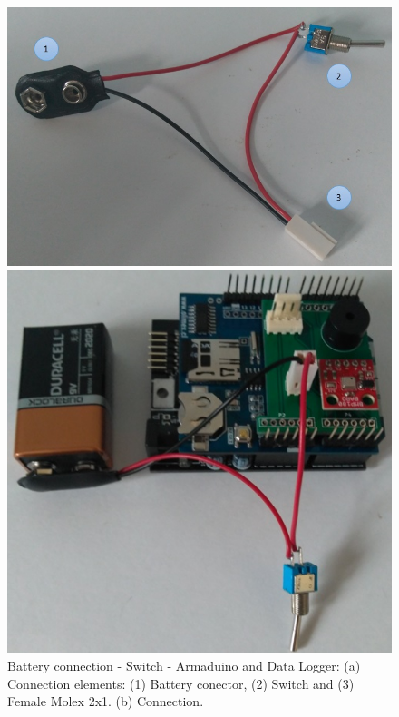 \documentclass[12pt,letterpaper]{article}
\numberwithin{figure}{section}
\numberwithin{equation}{section}
\numberwithin{table}{section}
\begin{document}
\begin{figure}[H]
    \centering
    \begin{minipage}{.45\textwidth}
    \centering
    \includegraphics[width=\linewidth]{Figuras/figure_20_a.jpg}
    \end{minipage}
    \centering
    \begin{minipage}{.45\textwidth}
    \centering
    \includegraphics[width=\linewidth]{Figuras/figure_20_b.jpg}
    \end{minipage}
        
    \caption{Battery connection - Switch - Armaduino and Data Logger: (a) Connection elements: (1) Battery conector, (2) Switch and (3) Female Molex 2x1. (b) Connection.}
    \label{fig:20}
\end{figure}
\end{document}
